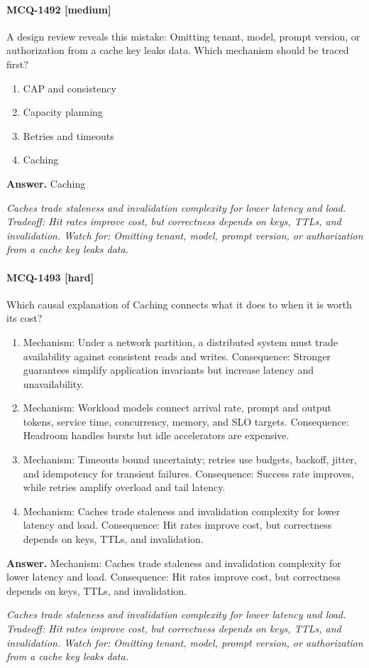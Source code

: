 \paragraph{MCQ-1492 [medium]} A design review reveals this mistake: Omitting tenant, model, prompt version, or authorization from a cache key leaks data. Which mechanism should be traced first?
\begin{enumerate}[label=\Alph*.]
\item CAP and consistency
\item Capacity planning
\item Retries and timeouts
\item Caching
\end{enumerate}
\noindent\textbf{Answer.} Caching
\par\textit{Caches trade staleness and invalidation complexity for lower latency and load. Tradeoff: Hit rates improve cost, but correctness depends on keys, TTLs, and invalidation. Watch for: Omitting tenant, model, prompt version, or authorization from a cache key leaks data.}
\paragraph{MCQ-1493 [hard]} Which causal explanation of Caching connects what it does to when it is worth its cost?
\begin{enumerate}[label=\Alph*.]
\item Mechanism: Under a network partition, a distributed system must trade availability against consistent reads and writes. Consequence: Stronger guarantees simplify application invariants but increase latency and unavailability.
\item Mechanism: Workload models connect arrival rate, prompt and output tokens, service time, concurrency, memory, and SLO targets. Consequence: Headroom handles bursts but idle accelerators are expensive.
\item Mechanism: Timeouts bound uncertainty; retries use budgets, backoff, jitter, and idempotency for transient failures. Consequence: Success rate improves, while retries amplify overload and tail latency.
\item Mechanism: Caches trade staleness and invalidation complexity for lower latency and load. Consequence: Hit rates improve cost, but correctness depends on keys, TTLs, and invalidation.
\end{enumerate}
\noindent\textbf{Answer.} Mechanism: Caches trade staleness and invalidation complexity for lower latency and load. Consequence: Hit rates improve cost, but correctness depends on keys, TTLs, and invalidation.
\par\textit{Caches trade staleness and invalidation complexity for lower latency and load. Tradeoff: Hit rates improve cost, but correctness depends on keys, TTLs, and invalidation. Watch for: Omitting tenant, model, prompt version, or authorization from a cache key leaks data.}
